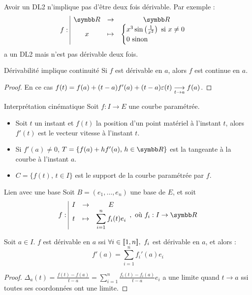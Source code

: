 \begin{remarque}
Avoir un DL2 n'implique pas d'être deux fois dérivable.
Par exemple :
\[\fonction{f}{\R}{\R}{x}{
    \begin{cases} x^3\sin\left(\frac 1 {x^2}\right)~\text{si}~x \not = 0 \\
    0~\text{sinon}
    \end{cases}}
\]
a un DL2 mais n'est pas dérivable deux fois.
\end{remarque}

\begin{corollaire}{Dérivabilité implique continuité}{}
    Si $f$ est dérivable en $a$, alors $f$ est continue en $a$.
\end{corollaire}

\begin{proof}
    En ce cas $f(t) = f(a) + (t-a)f'(a) + (t-a)\varepsilon(t) \underset{t \to a}{\longrightarrow} f(a)$.
\end{proof}

\begin{definition}{Interprétation cinématique}{}
    Soit $f : I \to E$ une courbe paramétrée. 

    \begin{itemize}
        \item Soit $t$ un instant et $f(t)$ la position d'un point matériel à l'instant 
        $t$, alors $f'(t)$ est le vecteur vitesse à l'instant $t$. 

        \item Si $f'(a) \neq 0$, $T = \{ f(a) + hf'(a), \, h \in \R\}$ est la tangeante à la courbe à l'instant 
        $a$. 

        \item $C = \{ f(t), \, t \in I\}$ est le support de la courbe paramétrée par $f$.  
    \end{itemize}
\end{definition}

\begin{proposition}{Lien avec une base}{}
    Soit $B = (e_1, \ldots, e_n)$ une base de $E$, et soit 
    \[\fonction{f}{I}{E}{t}{\sum_{i=1}^n f_i(t)e_i},~\text{où}~f_i : I \to \R\]

    Soit $a \in I$. $f$ est dérivable en $a$ ssi $\forall i \in [\![1, n]\!],~f_i$
    est dérivable en $a$, et alors :
    \[f'(a) = \sum_{i=1}^n f_i'(a)e_i\]
\end{proposition}

\begin{proof}
    $\Delta_a(t) = \displaystyle \frac{f(t) - f(a)}{t-a} = \sum_{i=1}^n \frac{f_i(t) - f_i(a)}{t-a}e_i$ a 
    une limite quand $t \to a $ ssi toutes ses coordonnées ont une limite.
\end{proof}

